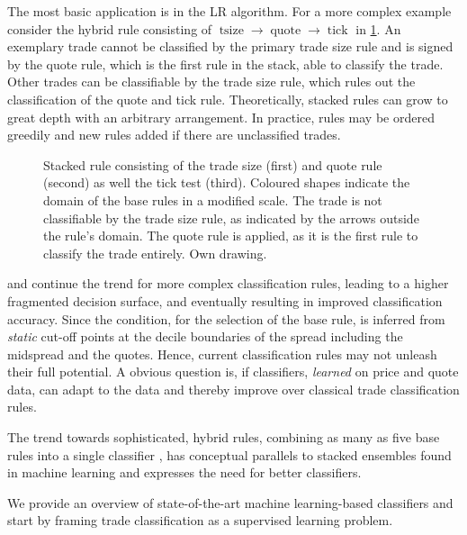 The most basic application is in the \gls{LR} algorithm. For a more complex example consider the hybrid rule consisting of $\operatorname{tsize} \to \operatorname{quote} \to \operatorname{tick}$ in \cref{fig:stacking-algo}. An exemplary trade cannot be classified by the primary trade size rule and is signed by the quote rule, which is the first rule in the stack, able to classify the trade. Other trades can be classifiable by the trade size rule, which rules out the classification of the quote and tick rule. Theoretically, stacked rules can grow to great depth with an arbitrary arrangement. In practice, rules may be ordered greedily and new rules added if there are unclassified trades.

\begin{figure}[ht!]
    \centering
    
    \caption[Stacked Trade Classification Rules]{Stacked rule consisting of the trade size (first) and quote rule (second) as well the tick test (third). Coloured shapes indicate the domain of the base rules in a modified scale. The trade is not classifiable by the trade size rule, as indicated by the arrows outside the rule's domain. The quote rule is applied, as it is the first rule to classify the trade entirely. Own drawing.}
    \label{fig:stacking-algo}
\end{figure}

\textcite[][3811]{chakrabartyTradeClassificationAlgorithms2007} and \textcite[][18]{grauerOptionTradeClassification2022} continue the trend for more complex classification rules, leading to a higher fragmented decision surface, and eventually resulting in improved classification accuracy. Since the condition, for the selection of the base rule, is inferred from \emph{static} cut-off points at the decile boundaries of the spread including the midspread and the quotes. Hence, current classification rules may not unleash their full potential. A obvious question is, if classifiers, \emph{learned} on price and quote data, can adapt to the data and thereby improve over classical trade classification rules.

The trend towards sophisticated, hybrid rules, combining as many as five base rules into a single classifier \autocite[cp.][18]{grauerOptionTradeClassification2022}, has conceptual parallels to stacked ensembles found in machine learning and expresses the need for better classifiers.

We provide an overview of state-of-the-art machine learning-based classifiers and start by framing trade classification as a supervised learning
problem.

